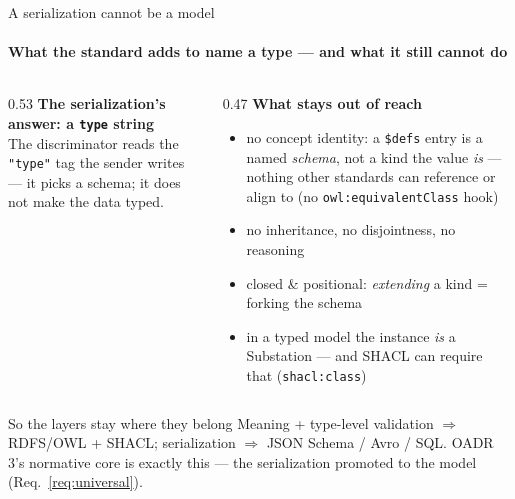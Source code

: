\begin{frame}{A serialization cannot be a model}
  \framesubtitle{What the standard adds to name a type — and what it still cannot do}
  \begin{columns}[T]
    \begin{column}{0.53\textwidth}
      \textbf{The serialization's answer: a \texttt{type} string}\\[0.4em]
      
      \vspace{0.2em}
      \small The discriminator reads the \texttt{"type"} tag the sender writes —
      it picks a schema; it does not make the data typed.
    \end{column}
    \begin{column}{0.47\textwidth}
      \textbf{What stays out of reach}\\[0.4em]
      \begin{itemize}\scriptsize
        \item no concept identity: a \texttt{\$defs} entry is a named \emph{schema}, not a kind the value \emph{is} — nothing other standards can reference or align to (no \texttt{owl:equivalentClass} hook)
        \item no inheritance, no disjointness, no reasoning
        \item closed \& positional: \emph{extending} a kind = forking the schema
        \item in a typed model the instance \emph{is} a Substation — and SHACL can require that (\texttt{shacl:class})
      \end{itemize}
    \end{column}
  \end{columns}
  \vspace{0.2em}
  \begin{alertblock}{So the layers stay where they belong}
    \small Meaning + type-level validation $\Rightarrow$ RDFS/OWL + SHACL;
    serialization $\Rightarrow$ JSON Schema / Avro / SQL.
    OADR 3's normative core is exactly this — the serialization promoted to
    the model (Req.\ \ref{req:universal}).
  \end{alertblock}
\end{frame}
